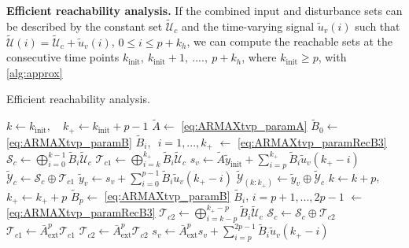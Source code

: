 \documentclass{article}
\begin{document}
\begin{theorem} \textbf{Efficient reachability analysis.} \label{theo:reach_eff}
    If the combined input and disturbance sets can be described by the constant set $\tilde{\mathcal{U}}_c$ and the time-varying signal $\tilde{u}_v(i)$ such that $\tilde{\mathcal{U}}(i) = \tilde{\mathcal{U}}_c + \tilde{u}_v(i)$, $0 \leq i\leq p+k_h$, we can compute the reachable sets at the consecutive time points $k_{\text{init}},~k_{\text{init}}+1,~ ....,~p+k_h$, where $k_{\text{init}} \geq p$, with \cref{alg:approx}
\vspace{-0.2cm}
\begin{algorithm}[hbt]
\caption{Efficient reachability analysis.}\label{alg:approx}
\begin{algorithmic}[1]
\State $k \gets k_{\text{init}},\quad k_+ \gets k_{\text{init}} +p-1$ 
\State $\tilde{A} \gets$ \cref{eq:ARMAXtvp_paramA} \label{algline:line2}
\State $\tilde{B}_0 \gets$ \cref{eq:ARMAXtvp_paramB}\label{algline:line3}
\State $\tilde{B}_i,$~{\small $i=1,...,k_+$} $\gets$ \cref{eq:ARMAXtvp_paramRecB3}\label{algline:line4}
\State $\mathcal{S}_c \gets \bigoplus_{i=0}^{k-1}\tilde{B}_i \tilde{\mathcal{U}}_c$ \label{algline:line5}
\State $\mathcal{T}_{c1} \gets \bigoplus_{i=k}^{k_+}\tilde{B}_i \tilde{\mathcal{U}}_c$  \label{algline:line6}
\State $s_v \gets \tilde{A} \tilde{y}_\text{init} + \sum_{i=p}^{k_+} \tilde{B}_{i}\tilde{u}_v(k_+-i)$\label{algline:line7}
\State $\tilde{\mathcal{Y}}_c \gets \mathcal{S}_c \oplus \mathcal{T}_{c1}$\label{algline:line9}
\State $\tilde{y}_v \gets s_v + \sum_{i=0}^{p-1}  \tilde{B}_{i} \tilde{u}_v(k_+-i)$\label{algline:line10}
\State $\tilde{\mathcal{Y}}_{(k:k_+)} \gets \tilde{y}_v \oplus \tilde{\mathcal{Y}}_c$ \label{algline:line11}
\State $k \gets k+p$,\quad $k_+ \gets k_++p$
 \label{algline:test2} %
\State $\tilde{B}_p \gets$ \cref{eq:ARMAXtvp_paramB} \label{algline:line14}
\State $\tilde{B}_i$, {\small $i=p+1,...,2p-1$} $\gets$ \cref{eq:ARMAXtvp_paramRecB3}\label{algline:line15}
\EndIf
{}
\State $\mathcal{T}_{c2} \gets \bigoplus_{i=k-p}^{k_+-p}\tilde{B}_i \tilde{\mathcal{U}}_c$\label{algline:line18}
\EndIf
\State $\mathcal{S}_c \gets \mathcal{S}_c \oplus \mathcal{T}_{c2}$ \label{algline:line20}
\State $\mathcal{T}_{c1} \gets \bar{A}_\text{ext}^p \mathcal{T}_{c1}$ \label{algline:line21}
\State $\mathcal{T}_{c2} \gets \bar{A}_\text{ext}^p \mathcal{T}_{c2}$ \label{algline:line22}
\State $s_v \gets \bar{A}_\text{ext}^{p} s_v  + \sum_{i=p}^{2p-1} \tilde{B}_{i} \tilde{u}_v(k_+-i)$ \label{algline:line23}
\EndWhile
\end{algorithmic}
\end{algorithm}
\end{theorem}
\end{document}
